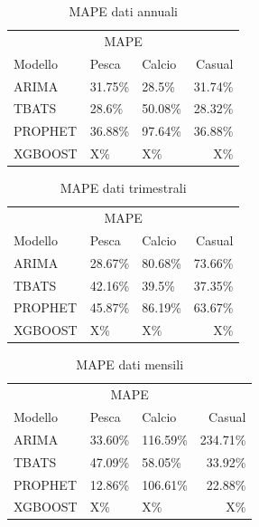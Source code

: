 \documentclass[12pt, a4paper, twocolumn]{article} %
\begin{document}
\begin{table}[H]
\caption{MAPE dati annuali}
\centering
	\begin{tabular}{lllr}
		\toprule
		\multicolumn{4}{c}{MAPE} \\
		\cmidrule(r){2-4}
			Modello & Pesca & Calcio & Casual \\
		\midrule
			ARIMA & 31.75\% & 28.5\% & 31.74\% \\
			TBATS & 28.6\% & 50.08\% & 28.32\% \\
			PROPHET & 36.88\% & 97.64\% & 36.88\% \\
			XGBOOST & X\% & X\% & X\% \\
		\bottomrule
	\end{tabular}
\end{table}

\begin{table}[H]
	\caption{MAPE dati trimestrali}
	\centering
		\begin{tabular}{lllr}
			\toprule
			\multicolumn{4}{c}{MAPE} \\
			\cmidrule(r){2-4}
				Modello & Pesca & Calcio & Casual \\
			\midrule
				ARIMA & 28.67\% & 80.68\% & 73.66\% \\
				TBATS & 42.16\% & 39.5\% & 37.35\% \\
				PROPHET & 45.87\% & 86.19\% & 63.67\% \\
				XGBOOST & X\% & X\% & X\% \\
			\bottomrule
		\end{tabular}
	\end{table}

	\begin{table}[H]
		\caption{MAPE dati mensili}
		\centering
			\begin{tabular}{lllr}
				\toprule
				\multicolumn{4}{c}{MAPE} \\
				\cmidrule(r){2-4}
					Modello & Pesca & Calcio & Casual \\
				\midrule
					ARIMA & 33.60\% & 116.59\% &234.71\% \\
					TBATS & 47.09\% & 58.05\% & 33.92\% \\
					PROPHET & 12.86\% & 106.61\% & 22.88\% \\
					XGBOOST & X\% & X\% & X\% \\
				\bottomrule
			\end{tabular}
		\end{table}
		
\end{document}
